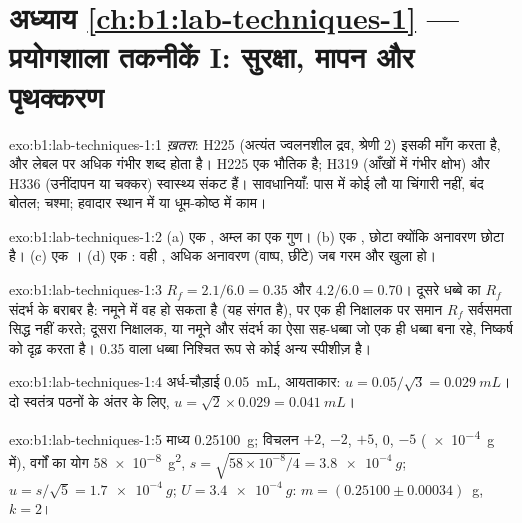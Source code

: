 \section*{अध्याय \ref{ch:b1:lab-techniques-1} --- प्रयोगशाला तकनीकें I: सुरक्षा, मापन और पृथक्करण}

\begin{solution}{exo:b1:lab-techniques-1:1}
\emph{ख़तरा}: H225 (अत्यंत ज्वलनशील द्रव, श्रेणी 2) इसकी माँग करता है, और
लेबल पर अधिक गंभीर शब्द होता है। H225 एक भौतिक  है; H319
(आँखों में गंभीर क्षोभ) और H336 (उनींदापन या चक्कर) स्वास्थ्य
संकट हैं। सावधानियाँ: पास में कोई लौ या चिंगारी नहीं, बंद बोतल; चश्मा;
हवादार स्थान में या धूम-कोष्ठ में काम।
\end{solution}

\begin{solution}{exo:b1:lab-techniques-1:2}
(a) एक , अम्ल का एक गुण। (b) एक , छोटा क्योंकि
अनावरण छोटा है। (c) एक । (d) एक : वही , अधिक अनावरण
(वाष्प, छींटे) जब गरम और खुला हो।
\end{solution}

\begin{solution}{exo:b1:lab-techniques-1:3}
$R_f = 2.1/6.0 = 0.35$ और $4.2/6.0 = 0.70$। दूसरे धब्बे का
$R_f$ संदर्भ के बराबर है: नमूने में वह हो सकता है (यह संगत है), पर
एक ही निक्षालक पर समान $R_f$ सर्वसमता सिद्ध नहीं करते; दूसरा निक्षालक, या
नमूने और संदर्भ का ऐसा सह-धब्बा जो एक ही धब्बा बना रहे, निष्कर्ष को
दृढ़ करता है। 0.35 वाला धब्बा निश्चित रूप से कोई अन्य स्पीशीज़ है।
\end{solution}

\begin{solution}{exo:b1:lab-techniques-1:4}
अर्ध-चौड़ाई \qty{0.05}{mL}, आयताकार: $u = 0.05/\sqrt3 = \qty{0.029}{mL}$।
दो स्वतंत्र पठनों के अंतर के लिए,
$u = \sqrt{2} \times 0.029 = \qty{0.041}{mL}$।
\end{solution}

\begin{solution}{exo:b1:lab-techniques-1:5}
माध्य \qty{0.25100}{g}; विचलन $+2$, $-2$, $+5$, 0, $-5$
(\qty{e-4}{g} में), वर्गों का योग \qty{58e-8}{g^2}, $s = \sqrt{58 \times
10^{-8}/4} = \qty{3.8e-4}{g}$; $u = s/\sqrt5 = \qty{1.7e-4}{g}$;
$U = \qty{3.4e-4}{g}$: $m = (0.25100 \pm 0.00034)$~g, $k = 2$।
\end{solution}

